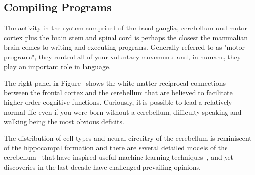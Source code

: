 






\subsection*{Compiling Programs}


The activity in the system comprised of the basal ganglia, cerebellum and motor cortex plus the brain stem and spinal cord is perhaps the closest the mammalian brain comes to writing and executing programs. Generally referred to as "motor programs", they control all of your voluntary movements and, in humans, they play an important role in language.

The right panel in Figure~{} shows the white matter reciprocal connections between the frontal cortex and the cerebellum that are believed to facilitate higher-order cognitive functions. Curiously, it is possible to lead a relatively normal life even if you were born without a cerebellum, difficulty speaking and walking being the most obvious deficits.

The distribution of cell types and neural circuitry of the cerebellum is reminiscent of the hippocampal formation and there are several detailed models of the cerebellum~\cite{MarrJoP-69,AlbusMB-71,ItoCEREBELLAR-CORTEX-18} that have inspired useful machine learning techniques~\cite{Albus75}, and yet discoveries in the last decade have challenged prevailing opinions.

